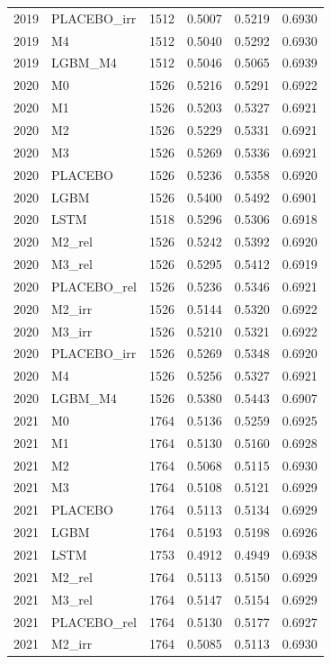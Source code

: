 \begin{tabular}{llrrrr}
2019 & PLACEBO\_irr & 1512 & 0.5007 & 0.5219 & 0.6930 \\
2019 & M4 & 1512 & 0.5040 & 0.5292 & 0.6930 \\
2019 & LGBM\_M4 & 1512 & 0.5046 & 0.5065 & 0.6939 \\
2020 & M0 & 1526 & 0.5216 & 0.5291 & 0.6922 \\
2020 & M1 & 1526 & 0.5203 & 0.5327 & 0.6921 \\
2020 & M2 & 1526 & 0.5229 & 0.5331 & 0.6921 \\
2020 & M3 & 1526 & 0.5269 & 0.5336 & 0.6921 \\
2020 & PLACEBO & 1526 & 0.5236 & 0.5358 & 0.6920 \\
2020 & LGBM & 1526 & 0.5400 & 0.5492 & 0.6901 \\
2020 & LSTM & 1518 & 0.5296 & 0.5306 & 0.6918 \\
2020 & M2\_rel & 1526 & 0.5242 & 0.5392 & 0.6920 \\
2020 & M3\_rel & 1526 & 0.5295 & 0.5412 & 0.6919 \\
2020 & PLACEBO\_rel & 1526 & 0.5236 & 0.5346 & 0.6921 \\
2020 & M2\_irr & 1526 & 0.5144 & 0.5320 & 0.6922 \\
2020 & M3\_irr & 1526 & 0.5210 & 0.5321 & 0.6922 \\
2020 & PLACEBO\_irr & 1526 & 0.5269 & 0.5348 & 0.6920 \\
2020 & M4 & 1526 & 0.5256 & 0.5327 & 0.6921 \\
2020 & LGBM\_M4 & 1526 & 0.5380 & 0.5443 & 0.6907 \\
2021 & M0 & 1764 & 0.5136 & 0.5259 & 0.6925 \\
2021 & M1 & 1764 & 0.5130 & 0.5160 & 0.6928 \\
2021 & M2 & 1764 & 0.5068 & 0.5115 & 0.6930 \\
2021 & M3 & 1764 & 0.5108 & 0.5121 & 0.6929 \\
2021 & PLACEBO & 1764 & 0.5113 & 0.5134 & 0.6929 \\
2021 & LGBM & 1764 & 0.5193 & 0.5198 & 0.6926 \\
2021 & LSTM & 1753 & 0.4912 & 0.4949 & 0.6938 \\
2021 & M2\_rel & 1764 & 0.5113 & 0.5150 & 0.6929 \\
2021 & M3\_rel & 1764 & 0.5147 & 0.5154 & 0.6929 \\
2021 & PLACEBO\_rel & 1764 & 0.5130 & 0.5177 & 0.6927 \\
2021 & M2\_irr & 1764 & 0.5085 & 0.5113 & 0.6930 \\

\end{tabular}

